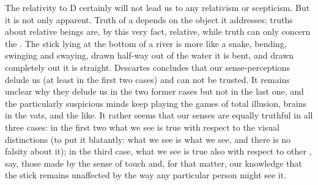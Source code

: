 \pa
The relativity to D certainly will not lead us to any relativism or
scepticism. But it is not only apparent. Truth of a  depends on the
object it addresses; truths about relative beings are, by this very fact,
relative, while  truth can only concern the .
The stick lying at the bottom of a river is more like a snake, bending, swinging
and swaying, drawn half-way out of the water it is bent, and drawn completely
out it is straight.  Descartes concludes that our sense-perceptions delude us
(at least in the first two cases) and can not be trusted. It remains unclear why
they delude us in the two former cases but not in the last one, and the
particularly suspicious minds keep playing the games of total illusion, brains
in the vats, and the like. It rather seems that our senses are equally
truthful in all three cases: in the first two what we see is true with respect
to the visual distinctions (to put it blatantly: what we see is what we see, and
there is no falsity about it); in the third case, what we see is true also with
respect to other , say, those made by the sense of touch and,
for that matter, our knowledge that the stick remains unaffected by the way any
particular person might see it.

